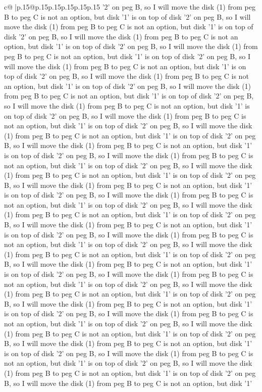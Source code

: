 \documentclass{article}
\begin{document}
{\begin{supertabular}{c@{$\;$}|p{.15\linewidth}@{}p{.15\linewidth}p{.15\linewidth}p{.15\linewidth}p{.15\linewidth}p{.15\linewidth}}
{{{'2' on peg B, so I will move the disk (1) from peg B to peg C is not an option, but disk '1' is on top of disk '2' on peg B, so I will move the disk (1) from peg B to peg C is not an option, but disk '1' is on top of disk '2' on peg B, so I will move the disk (1) from peg B to peg C is not an option, but disk '1' is on top of disk '2' on peg B, so I will move the disk (1) from peg B to peg C is not an option, but disk '1' is on top of disk '2' on peg B, so I will move the disk (1) from peg B to peg C is not an option, but disk '1' is on top of disk '2' on peg B, so I will move the disk (1) from peg B to peg C is not an option, but disk '1' is on top of disk '2' on peg B, so I will move the disk (1) from peg B to peg C is not an option, but disk '1' is on top of disk '2' on peg B, so I will move the disk (1) from peg B to peg C is not an option, but disk '1' is on top of disk '2' on peg B, so I will move the disk (1) from peg B to peg C is not an option, but disk '1' is on top of disk '2' on peg B, so I will move the disk (1) from peg B to peg C is not an option, but disk '1' is on top of disk '2' on peg B, so I will move the disk (1) from peg B to peg C is not an option, but disk '1' is on top of disk '2' on peg B, so I will move the disk (1) from peg B to peg C is not an option, but disk '1' is on top of disk '2' on peg B, so I will move the disk (1) from peg B to peg C is not an option, but disk '1' is on top of disk '2' on peg B, so I will move the disk (1) from peg B to peg C is not an option, but disk '1' is on top of disk '2' on peg B, so I will move the disk (1) from peg B to peg C is not an option, but disk '1' is on top of disk '2' on peg B, so I will move the disk (1) from peg B to peg C is not an option, but disk '1' is on top of disk '2' on peg B, so I will move the disk (1) from peg B to peg C is not an option, but disk '1' is on top of disk '2' on peg B, so I will move the disk (1) from peg B to peg C is not an option, but disk '1' is on top of disk '2' on peg B, so I will move the disk (1) from peg B to peg C is not an option, but disk '1' is on top of disk '2' on peg B, so I will move the disk (1) from peg B to peg C is not an option, but disk '1' is on top of disk '2' on peg B, so I will move the disk (1) from peg B to peg C is not an option, but disk '1' is on top of disk '2' on peg B, so I will move the disk (1) from peg B to peg C is not an option, but disk '1' is on top of disk '2' on peg B, so I will move the disk (1) from peg B to peg C is not an option, but disk '1' is on top of disk '2' on peg B, so I will move the disk (1) from peg B to peg C is not an option, but disk '1' is on top of disk '2' on peg B, so I will move the disk (1) from peg B to peg C is not an option, but disk '1' is on top of disk '2' on peg B, so I will move the disk (1) from peg B to peg C is not an option, but disk '1' is on top of disk '2' on peg B, so I will move the disk (1) from peg B to peg C is not an option, but disk '1' is on top of disk '2' on peg B, so I will move the disk (1) from peg B to peg C is not an option, but disk '1' is on top of disk '2' on peg B, so I will move the disk (1) from peg B to peg C is not an option, but disk '1' }}}
\end{supertabular}}
\end{document}
